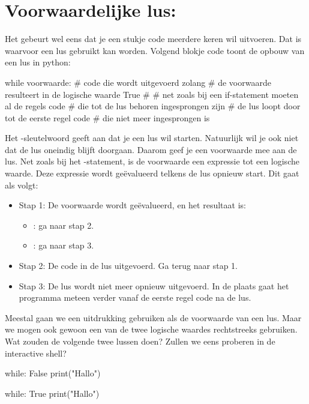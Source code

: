 \section{Voorwaardelijke lus: }

Het gebeurt wel eens dat je een stukje code meerdere keren wil uitvoeren.
Dat is waarvoor een lus gebruikt kan worden.
Volgend blokje code toont de opbouw van een lus in python:
\begin{pyEnv}
	while voorwaarde:
		# code die wordt uitgevoerd zolang
		# de voorwaarde resulteert in de logische waarde True
		#
		# net zoals bij een if-statement moeten al de regels code
		# die tot de lus behoren ingesprongen zijn
		# de lus loopt door tot de eerste regel code
		# die niet meer ingesprongen is
\end{pyEnv}
Het -sleutelwoord geeft aan dat je een lus wil starten.
Natuurlijk wil je ook niet dat de lus oneindig blijft doorgaan.
Daarom geef je een voorwaarde mee aan de lus.
Net zoals bij het -statement,
is de voorwaarde een expressie tot een logische waarde.
Deze expressie wordt ge\"evalueerd telkens de lus opnieuw start.
Dit gaat als volgt:
\begin{itemize}
	\item
		Stap 1:
		\newline
		De voorwaarde wordt ge\"evalueerd, en het resultaat is:
		\begin{itemize}
			\item \true: ga naar stap 2.
			\item \true: ga naar stap 3.
		\end{itemize}
	\item
		Stap 2:
		\newline
		De code in de lus uitgevoerd.
		\newline
		Ga terug naar stap 1.
	\item
		Stap 3:
		\newline
		De lus wordt niet meer opnieuw uitgevoerd.
		In de plaats gaat het programma meteen verder vanaf de eerste regel code na de lus.
\end{itemize}

\begin{letsTryOut}
	Meestal gaan we een uitdrukking gebruiken als de voorwaarde van een lus.
	Maar we mogen ook gewoon een van de twee logische waardes rechtstreeks gebruiken.
	\newline
	Wat zouden de volgende twee lussen doen?
	Zullen we eens proberen in de interactive shell?
\begin{pyEnv}
while: False
	print("Hallo")
\end{pyEnv}
\begin{pyEnv}
while: True
	print("Hallo")
\end{pyEnv}
\end{letsTryOut}

